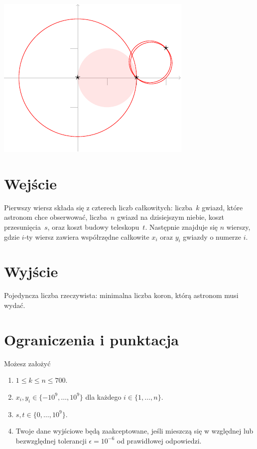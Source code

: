 \medskip
\noindent
\includegraphics[width=.3\textwidth]{img/samples.pdf}


\section*{Wejście}

Pierwszy wiersz składa się z czterech liczb całkowitych:
liczba~$k$ gwiazd, które astronom chce obserwować,
liczba~$n$ gwiazd na dzisiejszym niebie,
koszt przesunięcia~$s$, oraz
koszt budowy teleskopu~$t$.
Następnie znajduje się $n$ wierszy, gdzie $i$-ty wiersz zawiera współrzędne całkowite $x_i$ oraz $y_i$ gwiazdy o numerze $i$.

\section*{Wyjście}

Pojedyncza liczba rzeczywista: minimalna liczba koron, którą astronom musi wydać.

\section*{Ograniczenia i punktacja}

Możesz założyć 
\begin{enumerate}
\item $1\leq k\leq n\leq 700$. %
\item $x_i, y_i\in \{-10^9,\ldots, 10^9\}$ dla każdego $i\in\{1,\ldots,n\}$. %
\item $s,t\in \{0,\ldots, 10^9\}$. %
\item Twoje dane wyjściowe będą zaakceptowane, jeśli mieszczą się w względnej lub bezwzględnej tolerancji $\epsilon = 10^{-6}$ od prawidłowej odpowiedzi.
\end{enumerate}


